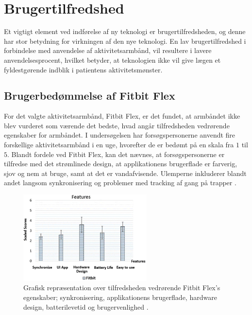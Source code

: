 \section{Brugertilfredshed}

Et vigtigt element ved indførelse af ny teknologi er brugertilfredsheden, og denne har stor betydning for virkningen af den nye teknologi. En lav brugertilfredshed i forbindelse med anvendelse af aktivitetsarmbånd, vil resultere i lavere anvendelsesprocent, hvilket betyder, at teknologien ikke vil give lægen et fyldestgørende indblik i patientens aktivitetsmønster.

\subsection{Brugerbedømmelse af Fitbit Flex} \label{sec:brugerbedommelse}

For det valgte aktivitetsarmbånd, Fitbit Flex, er det fundet, at armbåndet ikke blev vurderet som værende det bedste, hvad angår tilfredsheden vedrørende egenskaber for armbåndet. I undersøgelsen  har forsøgspersonerne anvendt fire forskellige aktivitetsarmbånd i en uge, hvorefter de er bedømt på en skala fra $1$ til $5$. Blandt fordele ved Fitbit Flex, kan det nævnes, at forsøgspersonerne er tilfredse med det strømlinede design, at applikationens brugerflade er farverig, sjov og nem at bruge, samt at det er vandafvisende. Ulemperne inkluderer blandt andet langsom synkronisering og problemer med tracking af gang på trapper \citep{kaewkannate2016}.

\begin{figure}[H]
	\centering
	\includegraphics[width=0.6\textwidth]{figures/FeatureSatisfaction2}
	\caption{Grafisk repræsentation over tilfredsheden vedrørende Fitbit Flex's egenskaber; synkronisering, applikationens brugerflade, hardware design, batterilevetid og brugervenlighed \citep{kaewkannate2016}.}
	\label{fig:FeatureSatisfaction}
\end{figure}

